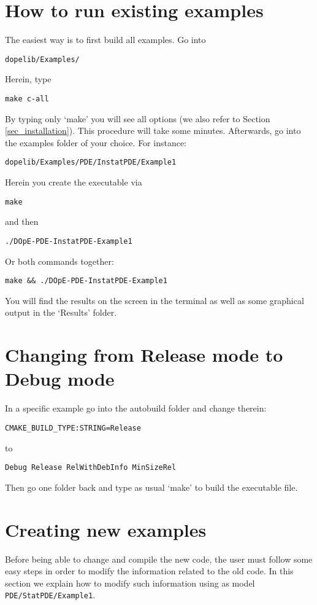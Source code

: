 \section{How to run existing examples}
The easiest way is to first build all examples. Go into 
\begin{lstlisting}
dopelib/Examples/
\end{lstlisting}
Herein, type 
\begin{lstlisting}
make c-all
\end{lstlisting}
By typing only `make' you will see all options 
(we also refer to Section \ref{sec_installation}).
This procedure will take some minutes. Afterwards,
go into the examples folder of your choice. For instance:
\begin{lstlisting}
dopelib/Examples/PDE/InstatPDE/Example1
\end{lstlisting}
Herein you create the executable via
\begin{lstlisting}
make 
\end{lstlisting}
and then 
\begin{lstlisting}
./DOpE-PDE-InstatPDE-Example1 
\end{lstlisting}
Or both commands together:
\begin{lstlisting}
make && ./DOpE-PDE-InstatPDE-Example1 
\end{lstlisting}
You will find the results on the screen in the terminal as well
as some graphical output in the `Results' folder.

\section{Changing from Release mode to Debug mode}
In a specific example go into the autobuild folder 
and change therein:
\begin{lstlisting}
CMAKE_BUILD_TYPE:STRING=Release
\end{lstlisting}
to 
\begin{lstlisting}
Debug Release RelWithDebInfo MinSizeRel
\end{lstlisting}
Then go one folder back and type as usual `make' to build the executable file.



\section{Creating new examples}
\label{getting_started}
Before being able to change and compile the new code, the user must 
follow some easy steps in order to modify the information related to the old code. In 
this section we explain how to modify such information using as model 
\texttt{PDE/StatPDE/Example1}.

